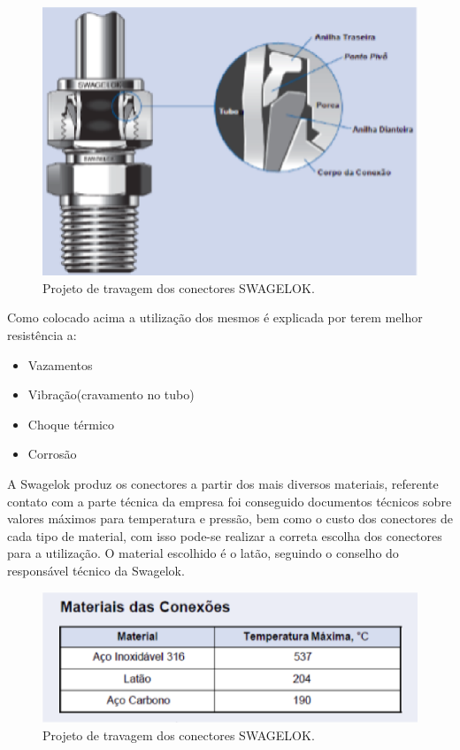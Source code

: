 \begin{figure}[!htb]                                                               
   \centering                                                                      
   \includegraphics[scale=0.6, keepaspectratio=true]{figuras/conectores.eps} 
   \caption{Projeto de travagem dos conectores SWAGELOK.}              
\end{figure}

Como colocado acima a utilização dos mesmos é explicada por terem melhor resistência a: 

\begin{itemize}
\item Vazamentos
\item Vibração(cravamento no tubo)
\item Choque térmico
\item Corrosão
\end{itemize}

A Swagelok produz os conectores a partir dos mais diversos materiais, referente contato com a parte técnica da empresa foi conseguido documentos técnicos sobre valores máximos para temperatura e pressão, bem como o custo dos conectores de cada tipo de material, com isso pode-se realizar a correta escolha dos conectores para a utilização.
O material escolhido é o latão, seguindo o conselho do responsável técnico da Swagelok.

\begin{figure}[!htb]                                                               
   \centering                                                                      
   \includegraphics[scale=0.6, keepaspectratio=true]{figuras/temperaturaconectores.eps} 
   \caption{Projeto de travagem dos conectores SWAGELOK.}              
\end{figure}


